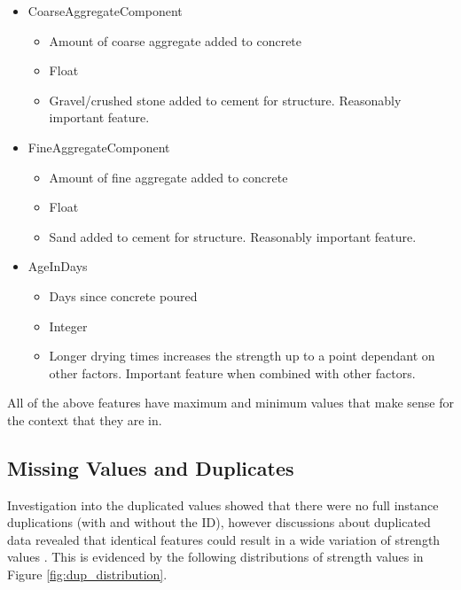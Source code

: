 \documentclass[onecolumn, 11pt]{article}
\begin{document}
\begin{itemize}
\begin{itemize}
  \end{itemize}
  \item CoarseAggregateComponent
  \begin{itemize}
    \item Amount of coarse aggregate added to concrete 
    \item Float
    \item Gravel/crushed stone added to cement for structure. Reasonably important feature. 
  \end{itemize}
  \item FineAggregateComponent
  \begin{itemize}
    \item Amount of fine aggregate added to concrete 
    \item Float
    \item Sand added to cement for structure. Reasonably important feature. 
  \end{itemize}
  \item AgeInDays
  \begin{itemize}
    \item Days since concrete poured 
    \item Integer
    \item Longer drying times increases the strength up to a point dependant on other factors. Important feature when combined with other factors. 
  \end{itemize}
\end{itemize}

All of the above features have maximum and minimum values that make sense for the context that they are in.

\subsection*{Missing Values and Duplicates}
Investigation into the duplicated values showed that there were no full instance duplications (with and without the ID), however discussions about duplicated data revealed that identical features could result in a wide variation of strength values \cite{duplicated_values}. This is evidenced by the following distributions of strength values in Figure \ref{fig:dup_distribution}. 
\end{document}
